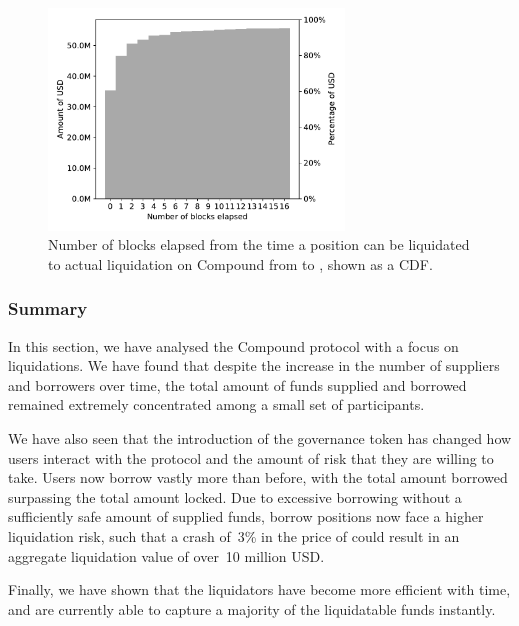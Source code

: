 \begin{figure}[tbp]
	\centering
	\includegraphics[width=0.7\textwidth]{./5b-economic-security/figures/time-to-liquidation.pdf}
	\caption[Number of blocks elapsed until liquidation]{Number of blocks elapsed from the time a position can be liquidated to actual liquidation on Compound from \StartDate to \EndDate, shown as a CDF.}
	\label{fig:blocks-spent}
\end{figure}

\subsubsection{Summary}
In this section, we have analysed the Compound protocol with a focus on liquidations.
We have found that despite the increase in the number of suppliers and borrowers over time, the total amount of funds supplied and borrowed remained extremely concentrated among a small set of participants.

We have also seen that the introduction of the  governance token has changed how users interact with the protocol and the amount of risk that they are willing to take.
Users now borrow vastly more than before, with the total amount borrowed surpassing the total amount locked.
Due to excessive borrowing without a sufficiently safe amount of supplied funds, borrow positions now face a higher liquidation risk, such that a crash of~3\% in the price of  could result in an aggregate liquidation value of over~10 million USD.

Finally, we have shown that the liquidators have become more efficient with time, and are currently able to capture a majority of the liquidatable funds instantly.
